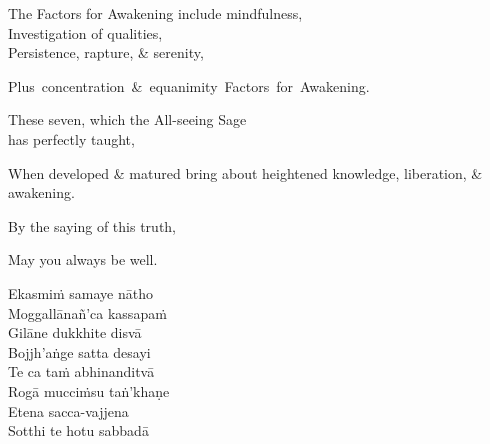 \begin{english-verses}
  The Factors for Awakening include mindfulness,\\
  Investigation of qualities,\\
  Persistence, rapture, \& serenity,\\
\begin{english-hang-together-verses}
  Plus~concentration~\&~equanimity~Factors~for~Awakening.
\end{english-hang-together-verses}
\begin{english-hang-together-verses}
  These seven, which the All-seeing Sage\\ has perfectly taught,
\end{english-hang-together-verses}
\ifninebythirteen\clearpage\fi
\begin{english-hang-together-verses}
  When developed \& matured bring about heightened knowledge, liberation, \& awakening.\\
\end{english-hang-together-verses}
\begin{english-hang-together-verses}
  By the saying of this truth,\\
\end{english-hang-together-verses}
\begin{english-hang-together-verses}
  May you always be well.
\end{english-hang-together-verses}
\end{english-verses}

\ifbfive\clearpage\fi

\begin{pali-hang-continued}
  Ekasmiṁ samaye nātho\\
  Moggallānañ'ca kassapaṁ\\
  Gilāne dukkhite disvā\\
  Bojjh'aṅge satta desayi\\
  Te ca taṁ abhinanditvā\\
  Rogā mucciṁsu taṅ'khaṇe\\
  Etena sacca-vajjena\\
  Sotthi te hotu sabbadā
\end{pali-hang-continued}


